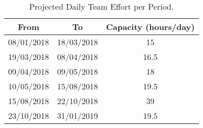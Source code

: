 \begin{table}[H]
\centering
\begin{tabular}{|c|c|c|}
\hline
\textbf{From} & \textbf{To} & \textbf{Capacity (hours/day)} \\ \hline
08/01/2018 & 18/03/2018 & 15 \\ \hline
19/03/2018 & 08/04/2018 & 16.5 \\ \hline
09/04/2018 & 09/05/2018 & 18 \\ \hline
10/05/2018 & 15/08/2018 & 19.5 \\ \hline
15/08/2018 & 22/10/2018 & 39 \\ \hline
23/10/2018 & 31/01/2019 & 19.5 \\ \hline
\end{tabular}
\caption{Projected Daily Team Effort per Period.}
\label{tab:daily-team-effort-per-period}
\end{table}